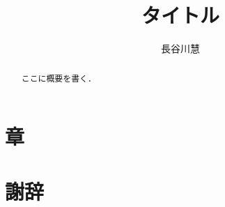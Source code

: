 \documentclass[uplatex]{suribt}
\title{タイトル}
\author{長谷川慧}
\theoremstyle{definition}
\begin{document}
\maketitle%

\frontmatter%
\begin{abstract}%
 ここに概要を書く．
\end{abstract}

\tableofcontents%

\mainmatter%
\chapter{章}

\backmatter%
\chapter{謝辞}%

\begin{thebibliography}{}%
 \bibitem{}
\end{thebibliography}

\appendix%
\chapter{}
\end{document}
